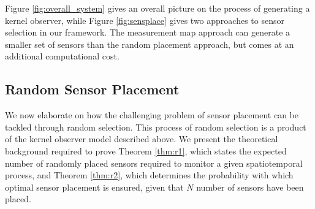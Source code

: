\documentclass[letterpaper,12pt,peerreviewca,draftcls]{IEEEtran}
\newcommand{\nsamp}{N}
\begin{document}
Figure \ref{fig:overall_system} gives an overall picture on the process of generating a kernel observer, while Figure \ref{fig:sensplace} gives two approaches to sensor selection in our framework. The measurement map approach can generate a smaller set of sensors than the random placement approach, but comes at an additional computational cost. 

\subsection{Random Sensor Placement}\label{sec:random_results}
We now elaborate on how the challenging problem of sensor placement can be tackled through random selection. This process of random selection is a product of the kernel observer model described above. We present the theoretical background required to prove Theorem \ref{thm:r1}, which states the expected number of randomly placed sensors required to monitor a given spatiotemporal process, and Theorem \ref{thm:r2}, which determines the probability with which optimal sensor placement is ensured, given that $\nsamp$ number of sensors have been placed. 
\end{document}
